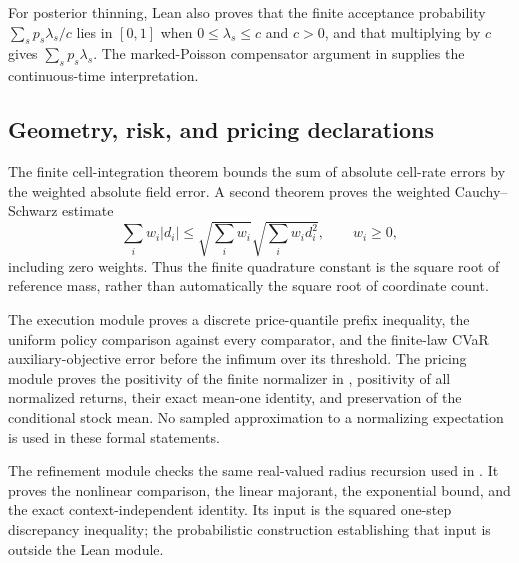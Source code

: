 For posterior thinning, Lean also proves that the finite acceptance probability
$\sum_sp_s\lambda_s/c$ lies in $[0,1]$ when $0\le\lambda_s\le c$ and $c>0$, and that multiplying by $c$ gives $\sum_sp_s\lambda_s$. The marked-Poisson compensator argument in  supplies the continuous-time interpretation.

\subsection{Geometry, risk, and pricing declarations}
The finite cell-integration theorem bounds the sum of absolute cell-rate errors by the weighted absolute field error. A second theorem proves the weighted Cauchy--Schwarz estimate
\[
 \sum_iw_i|d_i|
 \le\sqrt{\sum_iw_i}\sqrt{\sum_iw_id_i^2},
 \qquad w_i\ge0,
\]
including zero weights. Thus the finite quadrature constant is the square root of reference mass, rather than automatically the square root of coordinate count.

The execution module proves a discrete price-quantile prefix inequality, the uniform policy comparison against every comparator, and the finite-law CVaR auxiliary-objective error before the infimum over its threshold. The pricing module proves the positivity of the finite normalizer in , positivity of all normalized returns, their exact mean-one identity, and preservation of the conditional stock mean. No sampled approximation to a normalizing expectation is used in these formal statements.

The refinement module checks the same real-valued radius recursion used in . It proves the nonlinear comparison, the linear majorant, the exponential bound, and the exact context-independent identity. Its input is the squared one-step discrepancy inequality; the probabilistic construction establishing that input is outside the Lean module.

